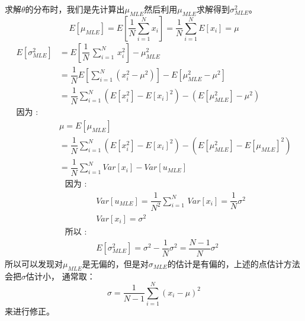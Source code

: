 \documentclass[withoutpreface,bwprint]{cumcmthesis} %
\begin{document}
	求解$\theta$的分布时，我们是先计算出$\mu_{MLE}$然后利用$\mu_{MLE}$求解得到$\sigma_{MLE}^2$。
	\begin{equation}
		E[\mu_{MLE}]=E[\dfrac{1}{N} \sum_{i=1}^N{x_i}]=\dfrac{1}{N} \sum_{i=1}^N{E[x_i]}=\mu
	\end{equation}
	\begin{align*}
		E[\sigma_{MLE}^2] & =E[\dfrac{1}{N}\, \sum_{i=1}^N \, x_i^2] - \mu_{MLE}^2\\
		&=\dfrac{1}{N}E[\sum_{i=1}^N (x_i^2-\mu^2)]-E[\mu_{MLE}^2-\mu^2]\\
		&=\dfrac{1}{N}\sum_{i=1}^N( E[x_i^2]-E[x_i]^2)-(E[\mu_{MLE}^2]-\mu^2)  \quad\quad\\
		 \text{因为 : }\\&\mu=E[\mu_{MLE}]\\
		&=\dfrac{1}{N}\sum_{i=1}^N(E[x_i^2]-E[x_i]^2)-(E[\mu_{MLE}^2]-E[\mu_{MLE}]^2)\\
		&=\dfrac{1}{N} \sum_{i=1}^N Var[x_i]-Var[u_{MLE}]
	\end{align*}
	\begin{align*}
		\text{ 因为 :   } &\\
		& Var[u_{MLE}] = \dfrac{1}{N^2} \sum_{i=1}^{N}\, Var[x_i]=\dfrac{1}{N}\sigma^2 \\
		& Var[x_i]=\sigma^2\\
		\text{ 所以 :   }&\\
		&E[\sigma_{MLE}^2]=\sigma^2-\dfrac{1}{N}\sigma^2=\dfrac{N-1}{N}\sigma^2
	\end{align*}
	所以可以发现对$\mu_{MLE}$是无偏的，但是对$\sigma_{MLE}$的估计是有偏的，上述的点估计方法会把$\sigma$估计小，
	通常取：
	\begin{equation}
		\sigma=\dfrac{1}{N-1}\sum_{i=1}^{N}(x_i-\mu)^2
	\end{equation}
	来进行修正。
\end{document}
